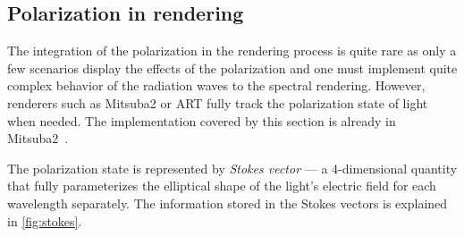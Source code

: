 \subsection{Polarization in rendering}
The integration of the polarization in the rendering process is quite rare as only a few scenarios display the effects of the polarization and one must implement quite complex behavior of the radiation waves to the spectral rendering. However, renderers such as Mitsuba2 or ART fully track the polarization state of light when needed. The implementation covered by this section is already in Mitsuba2~\cite{mitsubaWeb}.

The polarization state is represented by \emph{Stokes vector} --- a 4-dimensional quantity that fully parameterizes the elliptical shape of the light's electric field for each wavelength separately. The information stored in the Stokes vectors is explained in \autoref{fig:stokes}.

